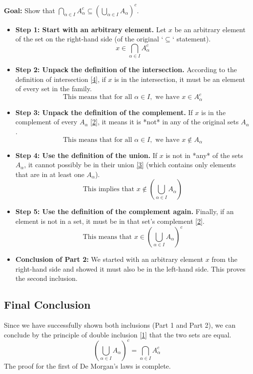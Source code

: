 \documentclass[11pt,a4paper]{article}
\begin{document}
\textbf{Goal:} Show that $\bigcap_{\alpha \in I} A_\alpha^c \subseteq \left( \bigcup_{\alpha \in I} A_\alpha \right)^c$.

\begin{itemize}
    \item \textbf{Step 1: Start with an arbitrary element.}
    Let $x$ be an arbitrary element of the set on the right-hand side (of the original `$\subseteq$` statement).
    $$ x \in \bigcap_{\alpha \in I} A_\alpha^c $$

    \item \textbf{Step 2: Unpack the definition of the intersection.}
    According to the definition of intersection \hyperlink{ref4}{[4]}, if $x$ is in the intersection, it must be an element of every set in the family.
    $$ \text{This means that for all } \alpha \in I, \text{ we have } x \in A_\alpha^c $$

    \item \textbf{Step 3: Unpack the definition of the complement.}
    If $x$ is in the complement of every $A_\alpha$ \hyperlink{ref2}{[2]}, it means it is *not* in any of the original sets $A_\alpha$.
    $$ \text{This means that for all } \alpha \in I, \text{ we have } x \notin A_\alpha $$

    \item \textbf{Step 4: Use the definition of the union.}
    If $x$ is not in *any* of the sets $A_\alpha$, it cannot possibly be in their union \hyperlink{ref3}{[3]} (which contains only elements that are in at least one $A_\alpha$).
    $$ \text{This implies that } x \notin \left( \bigcup_{\alpha \in I} A_\alpha \right) $$

    \item \textbf{Step 5: Use the definition of the complement again.}
    Finally, if an element is not in a set, it must be in that set's complement \hyperlink{ref2}{[2]}.
    $$ \text{This means that } x \in \left( \bigcup_{\alpha \in I} A_\alpha \right)^c $$

    \item \textbf{Conclusion of Part 2:} We started with an arbitrary element $x$ from the right-hand side and showed it must also be in the left-hand side. This proves the second inclusion.
\end{itemize}

\subsection{Final Conclusion}
Since we have successfully shown both inclusions (Part 1 and Part 2), we can conclude by the principle of double inclusion \hyperlink{ref1}{[1]} that the two sets are equal.
$$ \left( \bigcup_{\alpha \in I} A_\alpha \right)^c = \bigcap_{\alpha \in I} A_\alpha^c $$
The proof for the first of De Morgan's laws is complete.
\end{document}
